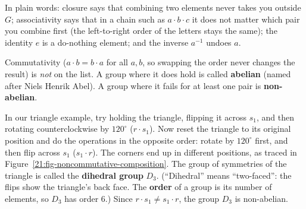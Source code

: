 In plain words: closure says that combining two elements never takes you outside $G$; associativity says that in a chain such as $a \cdot b \cdot c$ it does not matter which pair you combine first (the left-to-right order of the letters stays the same); the identity $e$ is a do-nothing element; and the inverse $a^{-1}$ undoes $a$.

Commutativity ($a \cdot b = b \cdot a$ for all $a, b$, so swapping the order never changes the result) is \emph{not} on the list. A group where it does hold is called \textbf{abelian} (named after Niels Henrik Abel). A group where it fails for at least one pair is \textbf{non-abelian}.

In our triangle example, try holding the triangle, flipping it across $s_1$, and then rotating counterclockwise by $120^\circ$ ($r \cdot s_1$). Now reset the triangle to its original position and do the operations in the opposite order: rotate by $120^\circ$ first, and then flip across $s_1$ ($s_1 \cdot r$). The corners end up in different positions, as traced in Figure~\ref{21:fig-noncommutative-composition}. The group of symmetries of the triangle is called the \textbf{dihedral group} $D_3$. (``Dihedral'' means ``two-faced'': the flips show the triangle's back face. The \textbf{order} of a group is its number of elements, so $D_3$ has order 6.) Since $r \cdot s_1 \neq s_1 \cdot r$, the group $D_3$ is non-abelian.


